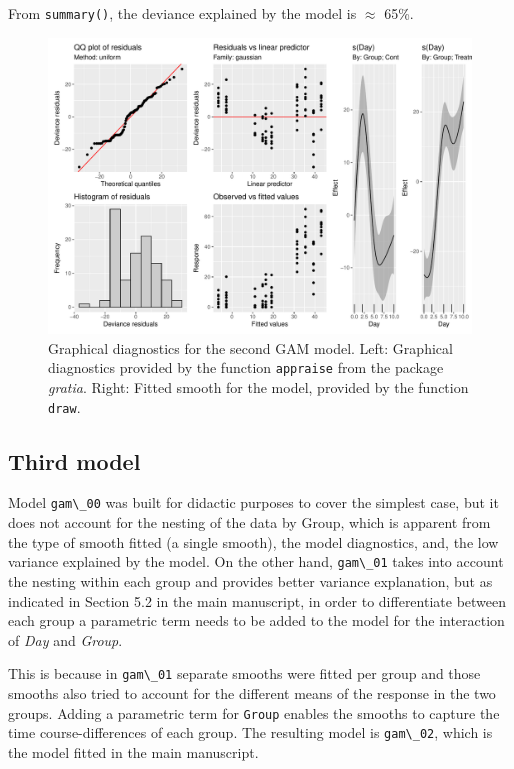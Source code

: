 \documentclass[
]{article}
\newcommand{\passthrough}[1]{#1}
\begin{document}
From \passthrough{\lstinline!summary()!}, the deviance explained by the model is \(\approx\) 65\%.



\begin{figure}

{\centering \includegraphics[width=0.75\linewidth]{Appendix_A_files/figure-latex/second-GAM-diag-1} 

}

\caption{Graphical diagnostics for the second GAM model. Left: Graphical diagnostics provided by the function \passthrough{\lstinline!appraise!} from the package \emph{gratia}. Right: Fitted smooth for the model, provided by the function \passthrough{\lstinline!draw!}.}\label{fig:second-GAM-diag}
\end{figure}

\hypertarget{third-model}{%
\subsection{Third model}\label{third-model}}

Model \passthrough{\lstinline!gam\_00!} was built for didactic purposes to cover the simplest case, but it does not account for the nesting of the data by Group, which is apparent from the type of smooth fitted (a single smooth), the model diagnostics, and, the low variance explained by the model. On the other hand, \passthrough{\lstinline!gam\_01!} takes into account the nesting within each group and provides better variance explanation, but as indicated in Section 5.2 in the main manuscript, in order to differentiate between each group a parametric term needs to be added to the model for the interaction of \emph{Day} and \emph{Group}.

This is because in \passthrough{\lstinline!gam\_01!} separate smooths were fitted per group and those smooths also tried to account for the different means of the response in the two groups. Adding a parametric term for \passthrough{\lstinline!Group!} enables the smooths to capture the time course-differences of each group. The resulting model is \passthrough{\lstinline!gam\_02!}, which is the model fitted in the main manuscript.
\end{document}
